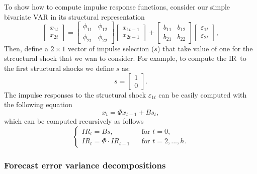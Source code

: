 \documentclass[10pt]{article}
\begin{document}
To show how to compute impulse response functions, consider our simple
bivariate VAR in its structural representation%
\begin{equation}
\left[ 
\begin{array}{c}
x_{1t} \\ 
x_{2t}%
\end{array}%
\right] =%
\begin{bmatrix}
\phi _{11} & \phi _{12} \\ 
\phi _{21} & \phi _{22}%
\end{bmatrix}%
\left[ 
\begin{array}{c}
x_{1t-1} \\ 
x_{2t-1}%
\end{array}%
\right] +\left[ 
\begin{array}{cc}
b_{11} & b_{12} \\ 
b_{21} & b_{22}%
\end{array}%
\right] 
\begin{bmatrix}
\varepsilon _{1t} \\ 
\varepsilon _{2t}%
\end{bmatrix}%
,
\end{equation}%
Then, define a $2\times 1$ vector of impulse selection ($s$) that take value
of one for the strcuctural shock that we wan to consider. For example, to
compute the IR\ to the first structural shocks we define $s$ as:%
\begin{equation*}
s=\left[ 
\begin{array}{c}
1 \\ 
0%
\end{array}%
\right] .
\end{equation*}%
The impulse responses to the structural shock $\varepsilon _{1t}$ can be
easily computed with the following equation%
\begin{equation*}
x_{t}=\Phi x_{t-1}+Bs_{t},
\end{equation*}%
which can be computed recursively as follows%
\begin{equation*}
\left\{ 
\begin{array}{ll}
IR_{t}=Bs, & \ \ \ \ \text{for }t=0, \\ 
IR_{t}=\Phi \cdot IR_{t-1} & \ \ \ \ \text{for }t=2,...,h.%
\end{array}%
\right.
\end{equation*}

\subsubsection{Forecast error variance decompositions}
\end{document}
